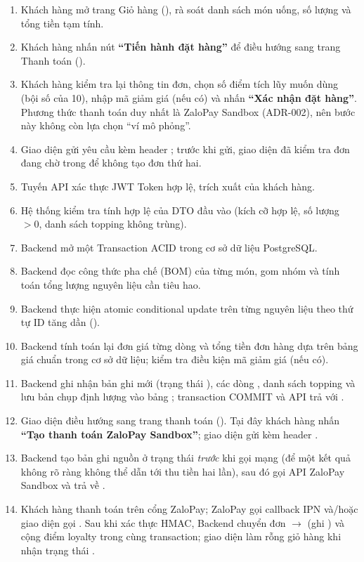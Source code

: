 \begin{enumerate}[label=\textbf{Bước \arabic*:}, leftmargin=4.2em]
  \item Khách hàng mở trang Giỏ hàng (), rà soát danh sách món uống, số lượng và tổng tiền tạm tính.
  \item Khách hàng nhấn nút \textbf{``Tiến hành đặt hàng''} để điều hướng sang trang Thanh toán ().
  \item Khách hàng kiểm tra lại thông tin đơn, chọn số điểm tích lũy muốn dùng (bội số của 10), nhập mã giảm giá (nếu có) và nhấn \textbf{``Xác nhận đặt hàng''}. Phương thức thanh toán duy nhất là ZaloPay Sandbox (ADR-002), nên bước này không còn lựa chọn ``ví mô phỏng''.
  \item Giao diện gửi yêu cầu  kèm header ; trước khi gửi, giao diện đã kiểm tra đơn đang chờ trong  để không tạo đơn thứ hai.
  \item Tuyến API xác thực JWT Token hợp lệ, trích xuất  của khách hàng.
  \item Hệ thống kiểm tra tính hợp lệ của DTO đầu vào (kích cỡ hợp lệ, số lượng $>0$, danh sách topping không trùng).
  \item Backend mở một Transaction ACID trong cơ sở dữ liệu PostgreSQL.
  \item Backend đọc công thức pha chế (BOM) của từng món, gom nhóm và tính toán tổng lượng nguyên liệu cần tiêu hao.
  \item Backend thực hiện atomic conditional update trên từng nguyên liệu theo thứ tự ID tăng dần ().
  \item Backend tính toán lại đơn giá từng dòng và tổng tiền đơn hàng dựa trên bảng giá chuẩn trong cơ sở dữ liệu; kiểm tra điều kiện mã giảm giá (nếu có).
  \item Backend ghi nhận bản ghi  mới (trạng thái ), các dòng , danh sách topping và lưu bản chụp định lượng vào bảng ; transaction COMMIT và API trả  với .
  \item Giao diện điều hướng sang trang thanh toán (). Tại đây khách hàng nhấn \textbf{``Tạo thanh toán ZaloPay Sandbox''}; giao diện gửi  kèm header .
  \item Backend tạo bản ghi  nguồn  ở trạng thái  \emph{trước} khi gọi mạng (để một kết quả không rõ ràng không thể dẫn tới thu tiền hai lần), sau đó gọi API ZaloPay Sandbox và trả về .
  \item Khách hàng thanh toán trên cổng ZaloPay; ZaloPay gọi callback IPN và/hoặc giao diện gọi . Sau khi xác thực HMAC, Backend chuyển đơn  $\rightarrow$  (ghi ) và cộng điểm loyalty trong cùng transaction; giao diện làm rỗng giỏ hàng khi nhận trạng thái .
\end{enumerate}

